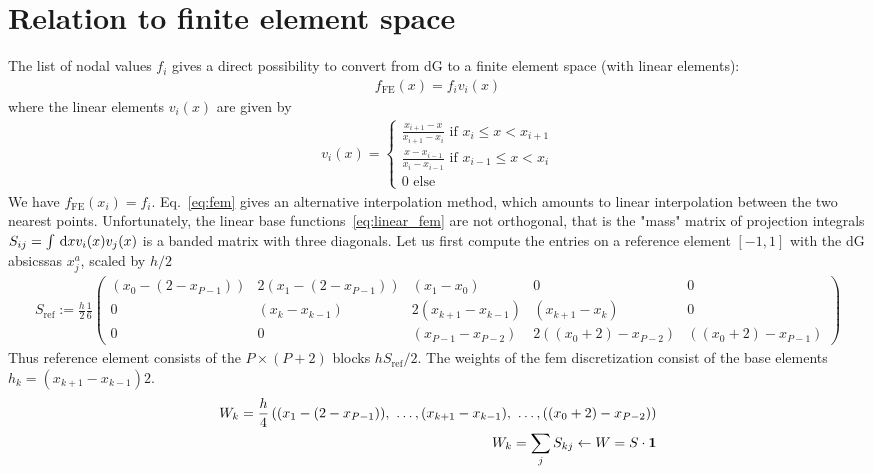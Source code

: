 \section{Relation to finite element space}
The list of nodal values $f_i$ gives a direct possibility to convert from dG to a finite element space (with linear elements):
\begin{align} \label{eq:fem}
    f_{\text{FE}}(x) = f_{i} v_{i}(x)
\end{align}
where the linear elements $v_i(x)$ are given by
\begin{align}\label{eq:linear_fem}
    v_{i}(x) = \begin{cases}
        \frac{x_{i+1} - x}{x_{i+1} - x_{i}} \text{ if } x_{i}\leq x<x_{i+1} \\
        \frac{x - x_{i-1} }{x_{i} - x_{i-1}} \text{ if } x_{i-1}\leq x<x_{i} \\
         0 \text{ else}
    \end{cases}
\end{align}
We have $f_{\text{FE}}(x_{i}) = f_{i}$. Eq.~\eqref{eq:fem} gives an alternative
interpolation method, which amounts to linear interpolation between the two nearest
points. Unfortunately, the linear base functions~\eqref{eq:linear_fem} are not
orthogonal, that is the "mass" matrix of projection integrals $S_{ij} = \int \,\mathrm{d}x v_i(x)v_j(x)$ is a banded matrix with three diagonals.
Let us first compute the entries on a reference element $[-1,1]$
with the dG absicssas $x_j^a$, scaled by $h/2$
\begin{align}
    S_{\text{ref}} := \frac{h}{2}\frac{1}{6}\begin{pmatrix}
        (x_0-(2-x_{P-1})) & 2(x_1 - (2-x_{P-1})) & (x_1 - x_0) & 0 & 0 \\
        0 & (x_{k} - x_{k-1}) & 2(x_{k+1}-x_{k-1}) & (x_{k+1} - x_k) & 0 \\
        0 & 0 & (x_{P-1} - x_{P-2}) & 2( (x_0+2) - x_{P-2}) & ((x_0+2)- x_{P-1})
    \end{pmatrix}
\end{align}
Thus reference element consists of the $P\times(P+2)$ blocks $hS_{\text{ref}}/2$.
The weights of the fem discretization consist of the base elements
$h_k = (x_{k+1}-x_{k-1})2$.
\begin{align}
    W_k = \frac{h}{4}\left( (x_1 - (2-x_{P-1})),\ \ldots, (x_{k+1}-x_{k-1}),\ \ldots, ( (x_0+2) - x_{P-2})\right) \\
    W_k = \sum_j S_{kj}\leftarrow W = S\cdot \mathbf{1}
\end{align}
